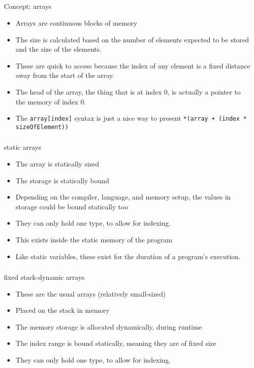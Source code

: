 \subsection{}
Concept: arrays

\begin{itemize}[noitemsep]
\item Arrays are continuous blocks of memory
\item The size is calculated based on the number of elements expected to be stored and the size of the elements.
\item These are quick to access because the index of any element is a fixed distance away from the start of the array.
\item The head of the array, the thing that is at index 0, is actually a pointer to the memory of index 0.
\item The \texttt{array[index]} syntax is just a nice way to present \texttt{*(array + (index * sizeOfElement))}
\end{itemize}

\subsubsection{}
static arrays

\begin{itemize}[noitemsep]
\item The array is statically sized
\item The storage is statically bound
\item Depending on the compiler, language, and memory setup, the values in storage could be bound statically too
\item They can only hold one type, to allow for indexing.
\item This exists inside the static memory of the program
\item Like static variables, these exist for the duration of a program's execution.
\end{itemize}

\subsubsection{}
fixed stack-dynamic arrays

\begin{itemize}[noitemsep]
\item These are the usual arrays (relatively small-sized)
\item Placed on the stack in memory
\item The memory storage is allocated dynamically, during runtime
\item The index range is bound statically, meaning they are of fixed size
\item They can only hold one type, to allow for indexing.
\end{itemize}


